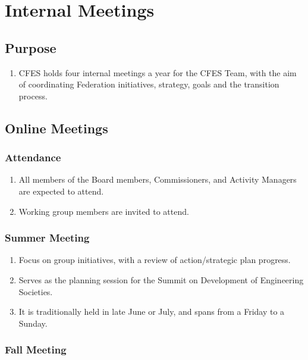 \section{Internal Meetings}
\label{internal-meetings}

\subsection{Purpose}
\label{purpose}

\begin{enumerate}
 \item
  CFES holds four internal meetings a year for the CFES Team, with the aim of coordinating Federation initiatives, strategy, goals and the transition process.
\end{enumerate}

\subsection{Online Meetings}
\label{online-meetings}

\subsubsection{Attendance}
\label{attendance}

\begin{enumerate}
 \item
  All members of the Board members, Commissioners, and Activity Managers are expected to attend.
 \item
  Working group members are invited to attend.
\end{enumerate}

\subsubsection{Summer Meeting}
\label{summer-meeting}

\begin{enumerate}
 \item
  Focus on group initiatives, with a review of action/strategic plan progress.
 \item
  Serves as the planning session for the Summit on Development of Engineering Societies.
 \item
  It is traditionally held in late June or July, and spans from a Friday to a Sunday.
\end{enumerate}

\subsubsection{Fall Meeting}
\label{fall-meeting}

